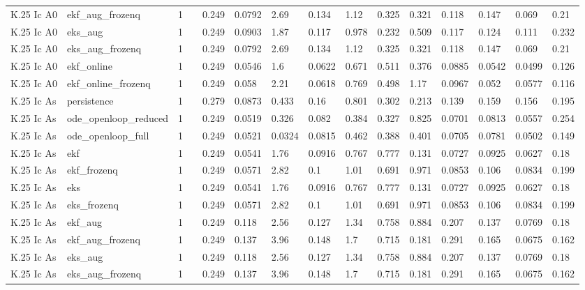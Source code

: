 \begin{table}[t]
\begin{tabular}{lllllllllllllll}
K.25 Ic A0 & ekf\_aug\_frozenq & 1 &  & 0.249 & 0.0792 & 2.69 & 0.134 & 1.12 & 0.325 & 0.321 & 0.118 & 0.147 & 0.069 & 0.21 \\
K.25 Ic A0 & eks\_aug & 1 &  & 0.249 & 0.0903 & 1.87 & 0.117 & 0.978 & 0.232 & 0.509 & 0.117 & 0.124 & 0.111 & 0.232 \\
K.25 Ic A0 & eks\_aug\_frozenq & 1 &  & 0.249 & 0.0792 & 2.69 & 0.134 & 1.12 & 0.325 & 0.321 & 0.118 & 0.147 & 0.069 & 0.21 \\
K.25 Ic A0 & ekf\_online & 1 &  & 0.249 & 0.0546 & 1.6 & 0.0622 & 0.671 & 0.511 & 0.376 & 0.0885 & 0.0542 & 0.0499 & 0.126 \\
K.25 Ic A0 & ekf\_online\_frozenq & 1 &  & 0.249 & 0.058 & 2.21 & 0.0618 & 0.769 & 0.498 & 1.17 & 0.0967 & 0.052 & 0.0577 & 0.116 \\
K.25 Ic As & persistence & 1 &  & 0.279 & 0.0873 & 0.433 & 0.16 & 0.801 & 0.302 & 0.213 & 0.139 & 0.159 & 0.156 & 0.195 \\
K.25 Ic As & ode\_openloop\_reduced & 1 &  & 0.249 & 0.0519 & 0.326 & 0.082 & 0.384 & 0.327 & 0.825 & 0.0701 & 0.0813 & 0.0557 & 0.254 \\
K.25 Ic As & ode\_openloop\_full & 1 &  & 0.249 & 0.0521 & 0.0324 & 0.0815 & 0.462 & 0.388 & 0.401 & 0.0705 & 0.0781 & 0.0502 & 0.149 \\
K.25 Ic As & ekf & 1 &  & 0.249 & 0.0541 & 1.76 & 0.0916 & 0.767 & 0.777 & 0.131 & 0.0727 & 0.0925 & 0.0627 & 0.18 \\
K.25 Ic As & ekf\_frozenq & 1 &  & 0.249 & 0.0571 & 2.82 & 0.1 & 1.01 & 0.691 & 0.971 & 0.0853 & 0.106 & 0.0834 & 0.199 \\
K.25 Ic As & eks & 1 &  & 0.249 & 0.0541 & 1.76 & 0.0916 & 0.767 & 0.777 & 0.131 & 0.0727 & 0.0925 & 0.0627 & 0.18 \\
K.25 Ic As & eks\_frozenq & 1 &  & 0.249 & 0.0571 & 2.82 & 0.1 & 1.01 & 0.691 & 0.971 & 0.0853 & 0.106 & 0.0834 & 0.199 \\
K.25 Ic As & ekf\_aug & 1 &  & 0.249 & 0.118 & 2.56 & 0.127 & 1.34 & 0.758 & 0.884 & 0.207 & 0.137 & 0.0769 & 0.18 \\
K.25 Ic As & ekf\_aug\_frozenq & 1 &  & 0.249 & 0.137 & 3.96 & 0.148 & 1.7 & 0.715 & 0.181 & 0.291 & 0.165 & 0.0675 & 0.162 \\
K.25 Ic As & eks\_aug & 1 &  & 0.249 & 0.118 & 2.56 & 0.127 & 1.34 & 0.758 & 0.884 & 0.207 & 0.137 & 0.0769 & 0.18 \\
K.25 Ic As & eks\_aug\_frozenq & 1 &  & 0.249 & 0.137 & 3.96 & 0.148 & 1.7 & 0.715 & 0.181 & 0.291 & 0.165 & 0.0675 & 0.162 \\

\end{tabular}
\end{table}
